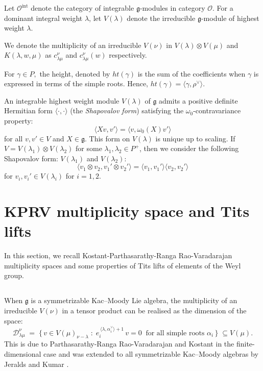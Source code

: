 \documentclass[12pt,reqno]{amsart}
\theoremstyle{plain}
\theoremstyle{definition}
\theoremstyle{plain}
\newcommand{\cato}{\mathcal{O}}
\newcommand{\catoint}{\mathcal{O}^{\mathrm{int}}}
\newcommand{\lie}{\mathfrak}
\newcommand{\lr}{c_{\lambda\mu}^\nu}
\begin{document}
Let $\catoint$ denote the category of integrable $\lie g$-modules in category $\cato$. For a dominant integral weight $\lambda$, let $V(\lambda)$ denote the
irreducible $\lie g$-module of highest weight $\lambda$. 


We denote the multiplicity of an irreducible $V(\nu)$ in  $V(\lambda)\otimes V(\mu)$ and $K(\lambda,w,\mu)$ as $\lr$ and $\lr(w)$ respectively. 

For $\gamma \in P,$ the height, denoted by $ht(\gamma)$ is the sum of the coefficients when $\gamma$ is expressed in terms of the simple roots. Hence, $ht(\gamma)= \langle \gamma,\rho^\vee\rangle.$

 An integrable highest weight module $V(\lambda)$ of $\lie g$ admits a positive definite Hermitian form $\langle \cdot, \cdot \rangle$ (the {\em Shapovalov form}) satisfying the $\omega_0$-contravariance property:
 \[ \langle Xv, v' \rangle = \langle v, \omega_0(X) v' \rangle \]
    for all $v, v' \in V$ and $X \in \lie g$.
This form on $V(\lambda)$ is unique up to scaling. If $V = V(\lambda_1) \otimes V(\lambda_2)$ for some $\lambda_1, \lambda_2 \in P^+$, then we consider the following Shapovalov form: $V(\lambda_1)$ and $V(\lambda_2)$:
\[\langle v_1\otimes v_2, v_1'\otimes v_2'\rangle = \langle v_1,v_1' \rangle \langle v_2,v_2' \rangle\]
for $v_i, v_i' \in V(\lambda_i)$ for $i=1, 2$.

\section{KPRV multiplicity space and Tits lifts}

In this section, we recall Kostant-Parthasarathy-Ranga Rao-Varadarajan multiplicity spaces and some properties of Tits lifts of elements of the Weyl group. 
\subsection{} When $\lie g$ is a symmetrizable Kac--Moody Lie algebra, the multiplicity of an irreducible $V(\nu)$ in a tensor product can be realised as the dimension of the space:
\begin{equation}\label{eq:prv1mult}
    \mathcal{D}_{\lambda\mu}^{\nu} \;=\; \bigl\{\,v\in V(\mu)_{\nu-\lambda}\;:\;
    e_i^{\,\langle\lambda,\alpha_i^\vee\rangle+1}\,v=0\ \text{ for all simple roots } \alpha_i\,\bigr\} \;\subseteq V(\mu).
\end{equation}
This is due to  Parthasarathy-Ranga Rao-Varadarajan \cite{PRV} and Kostant \cite{kostant-tensmult} in the finite-dimensional case and was extended to all symmetrizable Kac--Moody algebras by Jeralds and Kumar \cite{jeralds-kumar}.
\end{document}
